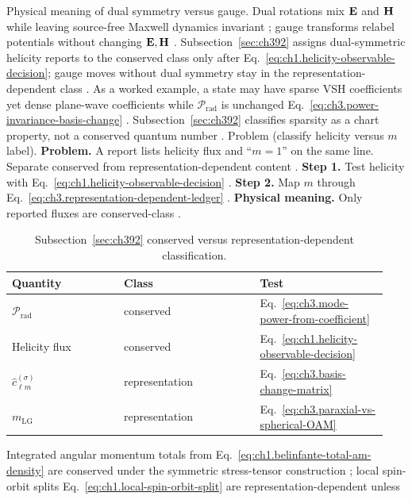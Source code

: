 Physical meaning of dual symmetry versus gauge. Dual rotations mix \(\mathbf{E}\) and \(\mathbf{H}\) while leaving source-free Maxwell dynamics invariant \cite{belinfante1940}; gauge
transforms relabel potentials without changing \(\mathbf{E},\mathbf{H}\) \cite{stratton1941}. Subsection~\ref{sec:ch392} assigns dual-symmetric
helicity reports to the conserved class only after Eq.~\eqref{eq:ch1.helicity-observable-decision}; gauge moves without dual symmetry stay in
the representation-dependent class \cite{harrington2001}.
As a worked example, a state may have sparse VSH coefficients yet dense plane-wave coefficients while \(\mathcal{P}_{\mathrm{rad}}\) is unchanged
Eq.~\eqref{eq:ch3.power-invariance-basis-change} \cite{hansen1988}. Subsection~\ref{sec:ch392} classifies sparsity
as a chart property, not a conserved quantum number \cite{harrington2001}.
Problem (classify helicity versus \(m\) label). \textbf{Problem.} A report lists helicity flux and ``\(m=1\)'' on the same line. Separate conserved from representation-dependent content
\cite{belinfante1940}.
\textbf{Step 1.} Test helicity with Eq.~\eqref{eq:ch1.helicity-observable-decision} \cite{belinfante1940}.
\textbf{Step 2.} Map \(m\) through Eq.~\eqref{eq:ch3.representation-dependent-ledger} \cite{hansen1988}.
\textbf{Physical meaning.} Only reported fluxes are conserved-class \cite{stratton1941}.
\begin{table}[t]
\centering
\caption{Subsection~\ref{sec:ch392} conserved versus representation-dependent classification.}
\label{tab:ch3.392-taxonomy}
\small
\begin{tabular}{@{}p{0.28\linewidth}p{0.34\linewidth}p{0.32\linewidth}@{}}
\toprule
Quantity & Class & Test \\
\midrule
\(\mathcal{P}_{\mathrm{rad}}\) & conserved & Eq.~\eqref{eq:ch3.mode-power-from-coefficient} \\
Helicity flux & conserved & Eq.~\eqref{eq:ch1.helicity-observable-decision} \\
\(\widehat{c}_{\ell m}^{(\sigma)}\) & representation & Eq.~\eqref{eq:ch3.basis-change-matrix} \\
\(m_{\mathrm{LG}}\) & representation & Eq.~\eqref{eq:ch3.paraxial-vs-spherical-OAM} \\
\bottomrule
\end{tabular}
\end{table}
Integrated angular momentum totals from Eq.~\eqref{eq:ch1.belinfante-total-am-density} are conserved under the symmetric stress-tensor construction
\cite{belinfante1940}; local spin-orbit splits Eq.~\eqref{eq:ch1.local-spin-orbit-split} are representation-dependent unless
